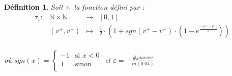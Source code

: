 \documentclass[12pt]{article}
\theoremstyle{defi}
\newtheorem{definition}{Définition}[section]
\theoremstyle{not}
\theoremstyle{prob}
\begin{document}
      \begin{definition}
        \label{ref:def_tau}
        Soit $\tau_1$ la fonction défini par :
        $$
          \begin{array}{rclc}
            \tau_1 :  & \mathbb{N} \times \mathbb{N} & \longrightarrow & [0, 1] \\
            & (v^+,v^-) & \longmapsto & \frac{1}{2} \cdot \left(1 + sgn(v^+ - v^-) \cdot \left(1 - e^{\frac{-|v^+ - v^-|}{\varepsilon}}\right)\right)\\
          \end{array}
        $$

        où
        $sgn(x) = \left\{
          \begin{array}{ll}
            -1  & \mbox{si } x < 0 \\
            1 & \mbox{sinon} \\
          \end{array}
        \right.$
        et $\varepsilon = - \frac{\#joueurs}{ln(0.04)}$
      \end{definition}
\end{document}
